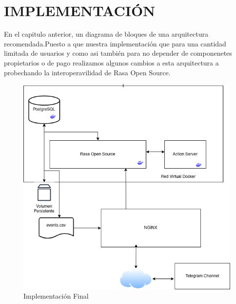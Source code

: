 \chapter[IMPLEMENTACION]{IMPLEMENTACIÓN}
En el capitulo anterior, un diagrama de bloques de una arquitectura recomendada.Puesto a que nuestra implementación que para una cantidad limitada de usuarios  y como asi también para no depender de componenetes propietarios o
de pago  realizamos algunos cambios a esta arquitectura a probechando la interoperavilidad de Rasa Open Source. 

\begin{figure}[h]
    \centering
    \includegraphics[width=\textwidth]{imagenes/cap4/server.png}
    \caption{Implementación Final}
    \label{fig:server_diagram}
\end{figure}


